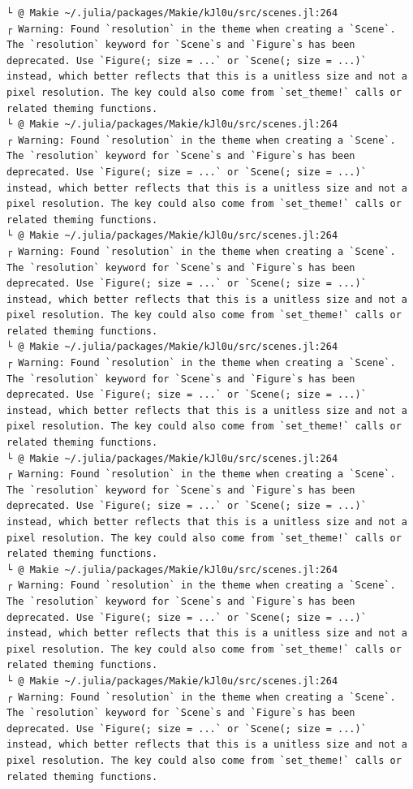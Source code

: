 \documentclass[
  12pt,
  a4paper,
  DIV=11,
  numbers=noendperiod]{scrreprt}
\begin{document}
\begin{verbatim}
└ @ Makie ~/.julia/packages/Makie/kJl0u/src/scenes.jl:264
┌ Warning: Found `resolution` in the theme when creating a `Scene`. The `resolution` keyword for `Scene`s and `Figure`s has been deprecated. Use `Figure(; size = ...` or `Scene(; size = ...)` instead, which better reflects that this is a unitless size and not a pixel resolution. The key could also come from `set_theme!` calls or related theming functions.
└ @ Makie ~/.julia/packages/Makie/kJl0u/src/scenes.jl:264
┌ Warning: Found `resolution` in the theme when creating a `Scene`. The `resolution` keyword for `Scene`s and `Figure`s has been deprecated. Use `Figure(; size = ...` or `Scene(; size = ...)` instead, which better reflects that this is a unitless size and not a pixel resolution. The key could also come from `set_theme!` calls or related theming functions.
└ @ Makie ~/.julia/packages/Makie/kJl0u/src/scenes.jl:264
┌ Warning: Found `resolution` in the theme when creating a `Scene`. The `resolution` keyword for `Scene`s and `Figure`s has been deprecated. Use `Figure(; size = ...` or `Scene(; size = ...)` instead, which better reflects that this is a unitless size and not a pixel resolution. The key could also come from `set_theme!` calls or related theming functions.
└ @ Makie ~/.julia/packages/Makie/kJl0u/src/scenes.jl:264
┌ Warning: Found `resolution` in the theme when creating a `Scene`. The `resolution` keyword for `Scene`s and `Figure`s has been deprecated. Use `Figure(; size = ...` or `Scene(; size = ...)` instead, which better reflects that this is a unitless size and not a pixel resolution. The key could also come from `set_theme!` calls or related theming functions.
└ @ Makie ~/.julia/packages/Makie/kJl0u/src/scenes.jl:264
┌ Warning: Found `resolution` in the theme when creating a `Scene`. The `resolution` keyword for `Scene`s and `Figure`s has been deprecated. Use `Figure(; size = ...` or `Scene(; size = ...)` instead, which better reflects that this is a unitless size and not a pixel resolution. The key could also come from `set_theme!` calls or related theming functions.
└ @ Makie ~/.julia/packages/Makie/kJl0u/src/scenes.jl:264
┌ Warning: Found `resolution` in the theme when creating a `Scene`. The `resolution` keyword for `Scene`s and `Figure`s has been deprecated. Use `Figure(; size = ...` or `Scene(; size = ...)` instead, which better reflects that this is a unitless size and not a pixel resolution. The key could also come from `set_theme!` calls or related theming functions.
└ @ Makie ~/.julia/packages/Makie/kJl0u/src/scenes.jl:264
┌ Warning: Found `resolution` in the theme when creating a `Scene`. The `resolution` keyword for `Scene`s and `Figure`s has been deprecated. Use `Figure(; size = ...` or `Scene(; size = ...)` instead, which better reflects that this is a unitless size and not a pixel resolution. The key could also come from `set_theme!` calls or related theming functions.

\end{verbatim}
\end{document}
